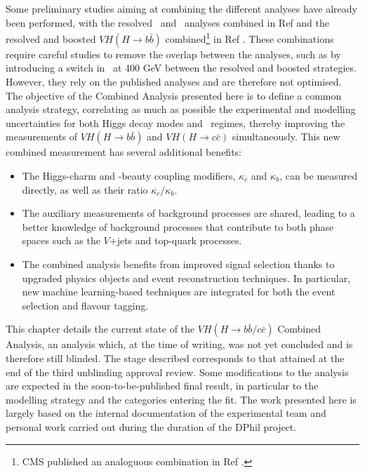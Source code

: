 Some preliminary studies aiming at combining the different analyses have already been performed, with the resolved \vhb\ and \vhc\ analyses combined in Ref \cite{Collaboration:2721696} and the resolved and boosted $VH (H \rightarrow b\bar{b})$ combined\footnote{CMS published an analoguous combination in Ref \cite{CMS-PAS-HIG-20-001}.} in Ref \cite{ATLAS:2021wqh}. These combinations require careful studies to remove the overlap between the analyses, such as by introducing a switch in \ptv\ at 400 GeV between the resolved and boosted strategies. However, they rely on the published analyses and are therefore not optimised. The objective of the Combined Analysis presented here is to define a common analysis strategy, correlating as much as possible the experimental and modelling uncertainties for both Higgs decay modes and \ptv\ regimes, thereby improving the measurements of $VH (H \rightarrow b\bar{b})$ and $VH (H \rightarrow c\bar{c})$ simultaneously. This new combined measurement has several additional benefits: 
\begin{itemize}
\item The Higgs-charm and -beauty coupling modifiers, $\kappa_c$ and $\kappa_b$, can be measured directly, as well as their ratio $\kappa_c/\kappa_b$. 
\item The auxiliary measurements of background processes are shared, leading to a better knowledge of background processes that contribute to both phase spaces such as the $V$+jets and top-quark processes.
\item The combined analysis benefits from improved signal selection thanks to upgraded physics objects and event reconstruction techniques. In particular, new machine learning-based techniques are integrated for both the event selection and flavour tagging.
\end{itemize}

This chapter details the current state of the $VH (H\rightarrow b\bar{b}/c\bar{c})$ Combined Analysis, an analysis which, at the time of writing, was not yet concluded and is therefore still blinded. The stage described corresponds to that attained at the end of the third unblinding approval review. Some modifications to the analysis are expected in the soon-to-be-published final result, in particular to the modelling strategy and the categories entering the fit. The work presented here is largely based on the internal documentation of the experimental team and personal work carried out during the duration of the DPhil project. 

